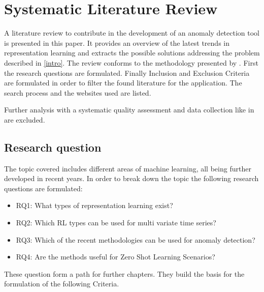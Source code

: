 \section{Systematic Literature Review}\label{methods}
A literature review to contribute in the development of an anomaly detection tool is presented in this paper. It provides an overview of the latest trends in representation learning and extracts the possible solutions addressing the problem described in \ref{intro}. The review conforms to the methodology presented by . First the research questions are formulated. Finally Inclusion and Exclusion Criteria are formulated in order to filter the found literature for the application. The search process and the websites used are listed.

Further analysis with a systematic quality assessment and data collection like in  are excluded.
\subsection{Research question}
The topic covered includes different areas of machine learning, all being further developed in recent years.
In order to break down the topic the following research questions are formulated:
\begin{itemize}
  \item RQ1: What types of representation learning exist?
  \item RQ2: Which RL types can be used for multi variate time series?
  \item RQ3: Which of the recent methodologies can be used for anomaly detection?
  \item RQ4: Are the methods useful for Zero Shot Learning Scenarios?
\end{itemize}
These question form a path for further chapters. They build the basis for the formulation of the following Criteria.
